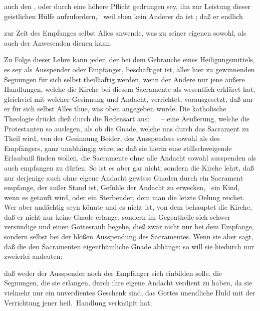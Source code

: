 \begin{aufza}
\begin{aufzb}
\begin{aufzc}
\item auch den , oder durch eine höhere Pflicht gedrungen sey, ihn zur Leistung dieser geistlichen Hülfe aufzufordern, \zB\  weil eben kein Anderer da ist \udgl ; daß er endlich
\item zur Zeit des Empfanges selbst Alles anwende, was zu seiner eigenen sowohl, als auch der Anwesenden  dienen kann.
\end{aufzc} 
\end{aufzb}
\begin{RWanm} 
Zu Folge dieser Lehre kann jeder, der bei dem Gebrauche eines Heiligungsmittels, es sey als Ausspender oder Empfänger, beschäftiget ist, aller hier zu gewinnenden Segnungen für sich selbst theilhaftig werden, wenn der Andere nur jene äußere Handlungen, welche die Kirche bei diesem Sacramente als wesentlich erkläret hat, gleichviel mit welcher Gesinnung und Andacht, verrichtet; vorausgesetzt, daß nur er für sich selbst Alles thue, was oben angegeben wurde. Die katholische Theologie drückt dieß durch die Redensart aus: ~\  -- eine Aeußerung, welche die Protestanten so auslegen, als ob die Gnade, welche uns durch das Sacrament zu Theil wird, von der Gesinnung Beider, des Ausspenders sowohl als des Empfängers, ganz unabhängig wäre, so daß sie hierin eine stillschweigende Erlaubniß finden wollen, die Sacramente ohne alle Andacht sowohl ausspenden als auch empfangen zu dürfen. So ist es aber gar nicht; sondern die Kirche lehrt, daß nur derjenige auch ohne eigene Andacht gewisse Gnaden durch ein Sacrament empfange, der außer Stand ist, Gefühle der Andacht zu erwecken, \zB\  ein Kind, wenn es getauft wird, oder ein Sterbender, dem man die letzte Oelung reichet. Wer aber andächtig seyn könnte und es nicht ist, von dem behauptet die Kirche, daß er nicht nur keine Gnade erlange, sondern im Gegentheile sich schwer versündige und einen Gottesraub begehe, dieß zwar nicht nur bei dem Empfange, sondern selbst bei der bloßen Ausspendung des Sacramentes. Wenn sie aber sagt, daß die den Sacramenten eigenthümliche Gnade  abhänge: so will sie hiedurch nur zweierlei andeuten:
\begin{aufzb}
\item daß weder der Ausspender noch der Empfänger sich einbilden solle, die Segnungen, die sie erlangen, durch ihre eigene Andacht verdient zu haben, da sie vielmehr nur ein unverdientes Geschenk sind, das Gottes unendliche Huld mit der Verrichtung jener heil.\ Handlung verknüpft hat;

\end{aufzb}
\end{RWanm}
\end{aufza}
